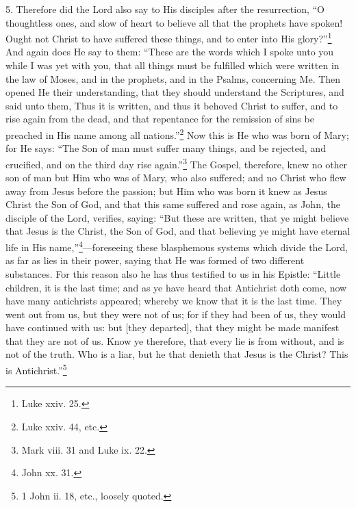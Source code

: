 5. Therefore did the Lord also say to His disciples after the resurrection, “O thoughtless ones, and slow of heart to believe all that the prophets have spoken! Ought not Christ to have suffered these things, and to enter into His glory?”\footnote{Luke xxiv. 25.} And again does He say to them: “These are the words which I spoke unto you while I was yet with you, that all things must be fulfilled which were written in the law of Moses, and in the prophets, and in the Psalms, concerning Me. Then opened He their understanding, that they should understand the Scriptures, and said unto them, Thus it is written, and thus it behoved Christ to suffer, and to rise again from the dead, and that repentance for the remission of sins be preached in His name among all nations.”\footnote{Luke xxiv. 44, etc.} Now this is He who was born of Mary; for He says: “The Son of man must suffer many things, and be rejected, and crucified, and on the third day rise again.”\footnote{Mark viii. 31 and Luke ix. 22.} The Gospel, therefore, knew no other son of man but Him who was of Mary, who also suffered; and no Christ who flew away from Jesus before the passion; but Him who was born it knew as Jesus Christ the Son of God, and that this same suffered and rose again, as John, the disciple of the Lord, verifies, saying: “But these are written, that ye might believe that Jesus is the Christ, the Son of God, and that believing ye might have eternal life in His name,”\footnote{John xx. 31.}—foreseeing these blasphemous systems which divide the Lord, as far as lies in their power, saying that He was formed of two different substances. For this reason also he has thus testified to us in his Epistle: “Little children, it is the last time; and as ye have heard that Antichrist doth come, now have many antichrists appeared; whereby we know that it is the last time. They went out from us, but they were not of us; for if they had been of us, they would have continued with us: but [they departed], that they might be made manifest that they are not of us. Know ye therefore, that every lie is from without, and is not of the truth. Who is a liar, but he that denieth that Jesus is the Christ? This is Antichrist.”\footnote{1 John ii. 18, etc., loosely quoted.}

